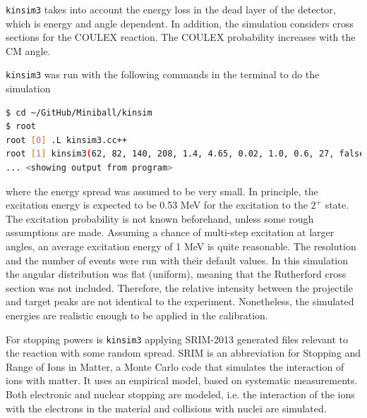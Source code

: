 \documentclass[twoside,english]{uiofysmaster/uiofysmaster}
\newcommand{\Sm}{$^{140}$Sm} %
\begin{document}
\texttt{kinsim3} takes into account the energy loss in the dead layer of the detector, which is energy and angle dependent. 
In addition, the simulation considers cross sections for the COULEX reaction. 
The COULEX probability increases with the CM angle.

\texttt{kinsim3} was run with the following commands in the terminal to do the simulation
\begin{lstlisting}[language=sh]
$ cd ~/GitHub/Miniball/kinsim
$ root
root [0] .L kinsim3.cc++
root [1] kinsim3(62, 82, 140, 208, 1.4, 4.65, 0.02, 1.0, 0.6, 27, false, 1e6, "../SRIM")
... <showing output from program>
\end{lstlisting}
where the energy spread was assumed to be very small. 
In principle, the excitation energy is expected to be 0.53 MeV for the excitation to the $2^+$ state. 
The excitation probability is not known beforehand, unless some rough assumptions are made.
Assuming a chance of multi-step excitation at larger angles, an average excitation energy of 1 MeV is quite reasonable.
The resolution and the number of events were run with their default values.
In this simulation the angular distribution was flat (uniform), meaning that the Rutherford cross section was not included. 
Therefore, the relative intensity between the projectile and target peaks are not identical to the experiment.
Nonetheless, the simulated energies are realistic enough to be applied in the calibration.

For stopping powers is \texttt{kinsim3} applying SRIM-2013 \cite{SRIM} generated files relevant to the reaction with some random spread.
SRIM is an abbreviation for Stopping and Range of Ions in Matter, a Monte Carlo code that simulates the interaction of ions with matter.
It uses an empirical model, based on systematic measurements. 
Both electronic and nuclear stopping are modeled, i.e. the interaction of the ions with the electrons in the material and collisions with nuclei are simulated.


%
%	
\end{document}
